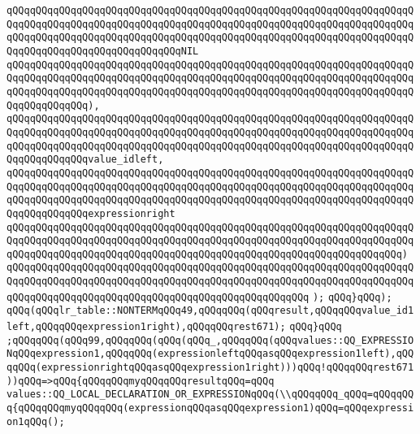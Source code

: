 \verb|qQQqqQQqqQQqqQQqqQQqqQQqqQQqqQQqqQQqqQQqqQQqqQQqqQQqqQQqqQQqqQQqqQQqqQQqqQQqqQQqqQQqqQQqqQQqqQQqqQQqqQQqqQQqqQQqqQQqqQQqqQQqqQQqqQQqqQQqqQQqqQQqqQQqqQQqqQQqqQQqqQQqqQQqqQQqqQQqqQQqqQQqqQQqqQQqqQQqqQQqqQQqqQQqqQQqqQQqqQQqqQQqqQQqqQQqqQQqqQQqNIL|\newline
\verb|qQQqqQQqqQQqqQQqqQQqqQQqqQQqqQQqqQQqqQQqqQQqqQQqqQQqqQQqqQQqqQQqqQQqqQQqqQQqqQQqqQQqqQQqqQQqqQQqqQQqqQQqqQQqqQQqqQQqqQQqqQQqqQQqqQQqqQQqqQQqqQQqqQQqqQQqqQQqqQQqqQQqqQQqqQQqqQQqqQQqqQQqqQQqqQQqqQQqqQQqqQQqqQQqqQQqqQQqqQQqqQQq),|\newline
\verb|qQQqqQQqqQQqqQQqqQQqqQQqqQQqqQQqqQQqqQQqqQQqqQQqqQQqqQQqqQQqqQQqqQQqqQQqqQQqqQQqqQQqqQQqqQQqqQQqqQQqqQQqqQQqqQQqqQQqqQQqqQQqqQQqqQQqqQQqqQQqqQQqqQQqqQQqqQQqqQQqqQQqqQQqqQQqqQQqqQQqqQQqqQQqqQQqqQQqqQQqqQQqqQQqqQQqqQQqqQQqqQQqvalue_idleft,|\newline
\verb|qQQqqQQqqQQqqQQqqQQqqQQqqQQqqQQqqQQqqQQqqQQqqQQqqQQqqQQqqQQqqQQqqQQqqQQqqQQqqQQqqQQqqQQqqQQqqQQqqQQqqQQqqQQqqQQqqQQqqQQqqQQqqQQqqQQqqQQqqQQqqQQqqQQqqQQqqQQqqQQqqQQqqQQqqQQqqQQqqQQqqQQqqQQqqQQqqQQqqQQqqQQqqQQqqQQqqQQqqQQqqQQqexpressionright|\newline
\verb|qQQqqQQqqQQqqQQqqQQqqQQqqQQqqQQqqQQqqQQqqQQqqQQqqQQqqQQqqQQqqQQqqQQqqQQqqQQqqQQqqQQqqQQqqQQqqQQqqQQqqQQqqQQqqQQqqQQqqQQqqQQqqQQqqQQqqQQqqQQqqQQqqQQqqQQqqQQqqQQqqQQqqQQqqQQqqQQqqQQqqQQqqQQqqQQqqQQqqQQqqQQqqQQq)|\newline
\verb|qQQqqQQqqQQqqQQqqQQqqQQqqQQqqQQqqQQqqQQqqQQqqQQqqQQqqQQqqQQqqQQqqQQqqQQqqQQqqQQqqQQqqQQqqQQqqQQqqQQqqQQqqQQqqQQqqQQqqQQqqQQqqQQqqQQqqQQqqQQqqQQqqQQqqQQqqQQqqQQqqQQqqQQqqQQqqQQqqQQqqQQqqQQqqQQq|\newline
\verb|);|\newline
\verb|qQQq}qQQq);|\newline
\verb|qQQq(qQQqlr_table::NONTERMqQQq49,qQQqqQQq(qQQqresult,qQQqqQQqvalue_id1left,qQQqqQQqexpression1right),qQQqqQQqrest671);|\newline
\verb|qQQq}qQQq|\newline
\verb|;qQQqqQQq(qQQq99,qQQqqQQq(qQQq(qQQq_,qQQqqQQq(qQQqvalues::QQ_EXPRESSIONqQQqexpression1,qQQqqQQq(expressionleftqQQqasqQQqexpression1left),qQQqqQQq(expressionrightqQQqasqQQqexpression1right)))qQQq!qQQqqQQqrest671))qQQq=>qQQq{qQQqqQQqmyqQQqqQQqresultqQQq=qQQq|\newline
\verb|values::QQ_LOCAL_DECLARATION_OR_EXPRESSIONqQQq(\\qQQqqQQq_qQQq=qQQqqQQq{qQQqqQQqmyqQQqqQQq(expressionqQQqasqQQqexpression1)qQQq=qQQqexpression1qQQq();|\newline
